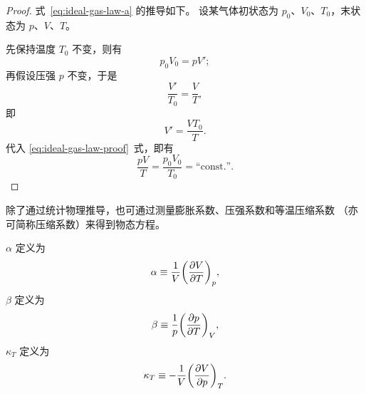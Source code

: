 \begin{proof}
  式~\eqref{eq:ideal-gas-law-a} 的推导如下。
  设某气体初状态为 $p_0$、$V_0$、$T_0$，末状态为 $p$、$V$、$T$。

  先保持温度 $T_0$ 不变，则有
  \begin{equation} \label{eq:ideal-gas-law-proof}
    p_0 V_0 = p V';
  \end{equation}
  再假设压强 $p$ 不变，于是
  \begin{equation}
    \frac{V'}{T_0} = \frac{V}{T},
  \end{equation}
  即
  \begin{equation}
    V' = \frac{V T_0}{T}.
  \end{equation}
  代入 \eqref{eq:ideal-gas-law-proof}~式，即有
  \begin{equation}
    \frac{p V}{T} = \frac{p_0 V_0}{T_0} = \text{``const.''}.
  \end{equation}
\end{proof}

除了通过统计物理推导，也可通过测量膨胀系数、压强系数和等温压缩系数
（亦可简称压缩系数）来得到物态方程。

 $\alpha$ 定义为
\begin{equation}
  \alpha \equiv \frac{1}{V} \qty(\pdv{V}{T})_p,
\end{equation}
 $\beta$ 定义为
\begin{equation}
  \beta \equiv \frac{1}{p} \qty(\pdv{p}{T})_V,
\end{equation}
 $\kappa_T$ 定义为
\begin{equation}
  \kappa_T \equiv -\frac{1}{V} \qty(\pdv{V}{p})_T.
\end{equation}

